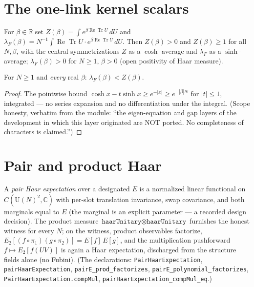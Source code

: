 \section{The one-link kernel scalars}

\begin{definition}\label{def:kernel_scalars}
\leanok
{}
For $\beta\in\mathbb R$ set
$Z(\beta)=\int e^{\beta\operatorname{Re}\operatorname{Tr}U}\,dU$ and
$\lambda_{F}(\beta)=N^{-1}\!\int\operatorname{Re}\operatorname{Tr}U
\cdot e^{\beta\operatorname{Re}\operatorname{Tr}U}\,dU$. Then
$Z(\beta)>0$ and $Z(\beta)\geq1$ for all $N,\beta$, with the central
symmetrizations $Z$ as a $\cosh$-average and $\lambda_{F}$ as a
$\sinh$-average; $\lambda_{F}(\beta)>0$ for $N\geq1$, $\beta>0$ (open
positivity of Haar measure).
\end{definition}

\begin{theorem}\label{thm:lamF_lt_Z}
\leanok
{}
For $N\geq1$ and \emph{every} real $\beta$:
$\lambda_{F}(\beta)<Z(\beta)$.
\end{theorem}
\begin{proof}
\leanok
{}
The pointwise bound
$\cosh x-t\sinh x\geq e^{-|x|}\geq e^{-|\beta|N}$ for $|t|\leq1$,
integrated --- no series expansion and no differentiation under the
integral. (Scope honesty, verbatim from the module: ``the
eigen-equation and gap layers of the development in which this layer
originated are NOT ported. No completeness of characters is
claimed.'')
\end{proof}

\section{Pair and product Haar}

\begin{definition}\label{def:pair_haar}
\leanok
{}
A \emph{pair Haar expectation} over a designated $E$ is a normalized
linear functional on $C(\mathrm U(N)^{2},\mathbb C)$ with per-slot
translation invariance, swap covariance, and both marginals equal to
$E$ (the marginal is an explicit parameter --- a recorded design
decision). The product measure
$\texttt{haarUnitary}\otimes\texttt{haarUnitary}$ furnishes the honest
witness for every $N$; on the witness, product observables factorize,
$E_{2}[(f\circ\pi_{1})(g\circ\pi_{2})]=E[f]\,E[g]$, and the
multiplication pushforward $f\mapsto E_{2}[f(UV)]$ is again a Haar
expectation, discharged from the structure fields alone (no Fubini).
(The declarations: \texttt{PairHaarExpectation},
\texttt{pairHaarExpectation}, \texttt{pairE\_prod\_factorizes},
\texttt{pairE\_polynomial\_factorizes},
\texttt{PairHaarExpectation.compMul},
\texttt{pairHaarExpectation\_compMul\_eq}.)
\end{definition}

